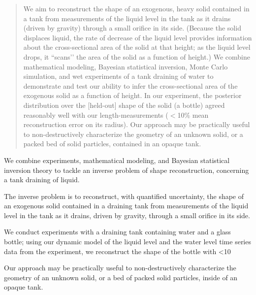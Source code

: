 \documentclass[a4paper,fleqn]{cas-dc}
\begin{document}
\begin{abstract}
We aim to reconstruct the shape of an exogenous, heavy solid contained in a tank from measurements of the liquid level in the tank as it drains (driven by gravity) through a small orifice in its side. (Because the solid displaces liquid, the rate of decrease of the liquid level provides information about the cross-sectional area of the solid at that height; as the liquid level drops, it ``scans’' the area of the solid as a function of height.) We combine mathematical modeling, Bayesian statistical inversion, Monte Carlo simulation, and wet experiments of a tank draining of water to demonstrate and test our ability to infer the cross-sectional area of the exogenous solid as a function of height. In our experiment, the posterior distribution over the [held-out] shape of the solid (a bottle) agreed reasonably well with our length-measurements ($<$10\% mean reconstruction error on its radius). Our approach may be practically useful to non-destructively characterize the geometry of an unknown solid, or a packed bed of solid particles, contained in an opaque tank.
\end{abstract}


\begin{highlights}
\item We combine experiments, mathematical modeling, and Bayesian statistical
inversion theory to tackle an inverse problem of shape reconstruction, concerning a
tank draining of liquid.
\item The inverse problem is to reconstruct, with quantified uncertainty, the shape of an
exogenous solid contained in a draining tank from measurements of the liquid level
in the tank as it drains, driven by gravity, through a small orifice in its side.
\item We conduct experiments with a draining tank containing water and a glass bottle;
using our dynamic model of the liquid level and the water level time series data
from the experiment, we reconstruct the shape of the bottle with <10%
\item Our approach may be practically useful to non-destructively characterize the
geometry of an unknown solid, or a bed of packed solid particles, inside of an
opaque tank.
\end{highlights}
\end{document}
